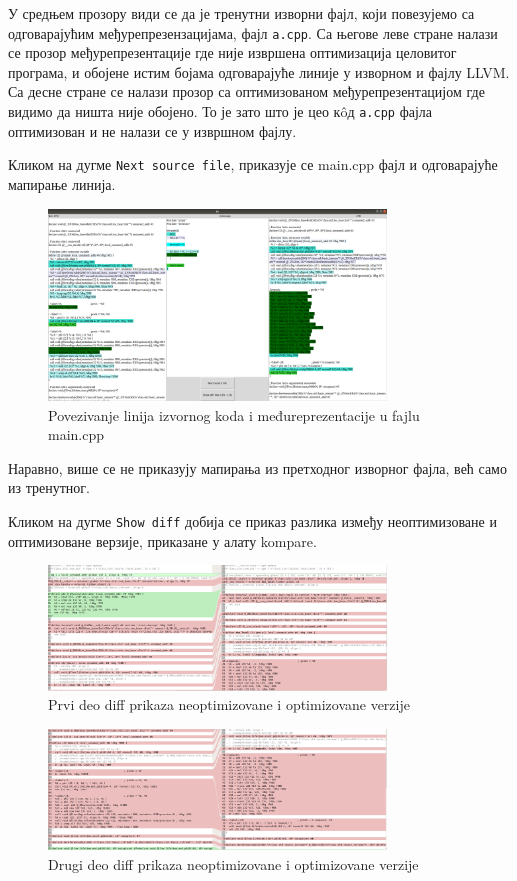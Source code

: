 \documentclass[12pt,oneside]{memoir}
\begin{document}
У средњем прозору види се да је тренутни изворни фајл, који повезујемо са одговарајућим
међурепрезензацијама, фајл \texttt{a.cpp}.
Са његове леве стране налази се прозор међурепрезентације где није извршена оптимизација
целовитог програма, и обојене истим бојама одговарајуће линије у изворном и
фајлу LLVM.
Са десне стране се налази прозор са оптимизованом међурепрезентацијом где видимо
да ништа није обојено.
То је зато што је цео к\^{o}д  \texttt{a.cpp} фајла оптимизован
и не налази се у извршном фајлу.

Кликом на дугме \texttt{Next source file}, приказује се main.cpp фајл и одговарајуће 
мапирање линија.
\begin{figure}[!ht]
  \centering
  \includegraphics[width=0.8\textwidth]{main_cpp.png}
  \caption{Povezivanje linija izvornog koda i međureprezentacije u fajlu main.cpp  }
  \label{fig:grafikon}
\end{figure}
Наравно, више се не приказују мапирања из претходног изворног фајла, већ само из
тренутног.

Кликом на дугме \texttt{Show diff} добија се приказ разлика између неоптимизоване и оптимизоване
верзије, приказане у алату kompare.
\begin{figure}[!ht]
  \centering
  \includegraphics[width=0.8\textwidth]{diff_1.png}
  \caption{Prvi deo diff prikaza neoptimizovane i optimizovane verzije }
  \label{fig:grafikon}
\end{figure}
\begin{figure}[!ht]
  \centering
  \includegraphics[width=0.8\textwidth]{diff_2.png}
  \caption{Drugi deo diff prikaza neoptimizovane i optimizovane verzije }
  \label{fig:grafikon}
\end{figure}
\end{document}
